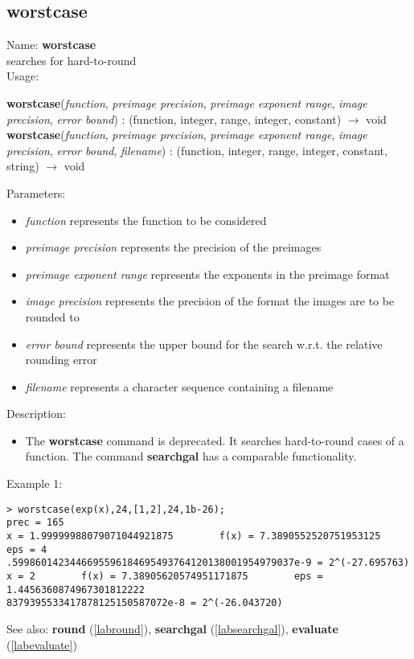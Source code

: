 \subsection{worstcase}
\label{labworstcase}
\noindent Name: \textbf{worstcase}\\
searches for hard-to-round\\
\noindent Usage: 
\begin{center}
\textbf{worstcase}(\emph{function}, \emph{preimage precision}, \emph{preimage exponent range}, \emph{image precision}, \emph{error bound}) : (\textsf{function}, \textsf{integer}, \textsf{range}, \textsf{integer}, \textsf{constant}) $\rightarrow$ \textsf{void}
\\ 
\textbf{worstcase}(\emph{function}, \emph{preimage precision}, \emph{preimage exponent range}, \emph{image precision}, \emph{error bound}, \emph{filename}) : (\textsf{function}, \textsf{integer}, \textsf{range}, \textsf{integer}, \textsf{constant}, \textsf{string}) $\rightarrow$ \textsf{void}
\\ 
\end{center}
Parameters: 
\begin{itemize}
\item \emph{function} represents the function to be considered
\item \emph{preimage precision} represents the precision of the preimages
\item \emph{preimage exponent range} represents the exponents in the preimage format
\item \emph{image precision} represents the precision of the format the images are to be rounded to
\item \emph{error bound} represents the upper bound for the search w.r.t. the relative rounding error
\item \emph{filename} represents a character sequence containing a filename
\end{itemize}
\noindent Description: \begin{itemize}

\item The \textbf{worstcase} command is deprecated. It searches hard-to-round cases of
   a function. The command \textbf{searchgal} has a comparable functionality.
\end{itemize}
\noindent Example 1: 
\begin{center}\begin{minipage}{15cm}\begin{Verbatim}[frame=single]
> worstcase(exp(x),24,[1,2],24,1b-26);
prec = 165
x = 1.99999988079071044921875        f(x) = 7.3890552520751953125        eps = 4
.5998601423446695596184695493764120138001954979037e-9 = 2^(-27.695763) 
x = 2        f(x) = 7.38905620574951171875        eps = 1.4456360874967301812222
8379395533417878125150587072e-8 = 2^(-26.043720) 

\end{Verbatim}
\end{minipage}\end{center}
See also: \textbf{round} (\ref{labround}), \textbf{searchgal} (\ref{labsearchgal}), \textbf{evaluate} (\ref{labevaluate})
